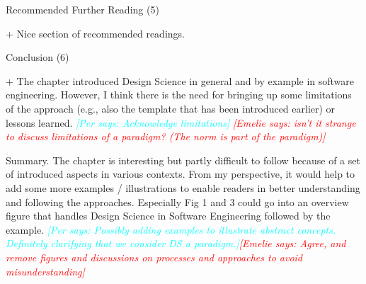 \documentclass{article}
\newcommand{\emelie}[1]{\textcolor{red}{{\it [Emelie says: #1]}}}
\newcommand{\per}[1]{\textcolor{cyan}{{\it [Per says: #1]}}}
\newcommand{\emelie}[1]{}
\newcommand{\per}[1]{}
\begin{document}
Recommended Further Reading (5)

+ Nice section of recommended readings.

Conclusion (6)

+ The chapter introduced Design Science in general and by example in software engineering. However, I think there is the need for bringing up some limitations of the approach (e.g., also the template that has been introduced earlier) or lessons learned. \per{Acknowledge limitations} \emelie{isn't it strange to discuss limitations of a paradigm? (The norm is part of the paradigm)}

Summary. The chapter is interesting but partly difficult to follow because of a set of introduced aspects in various contexts. From my perspective, it would help to add some more examples / illustrations to enable readers in better understanding and following the approaches. Especially Fig 1 and 3 could go into an overview figure that handles Design Science in Software Engineering followed by the example. \per{Possibly adding examples to illustrate abstract concepts. Definitely clarifying that we consider DS a paradigm.}\emelie{Agree, and remove figures and discussions on processes and approaches to avoid misunderstanding}
\end{document}
